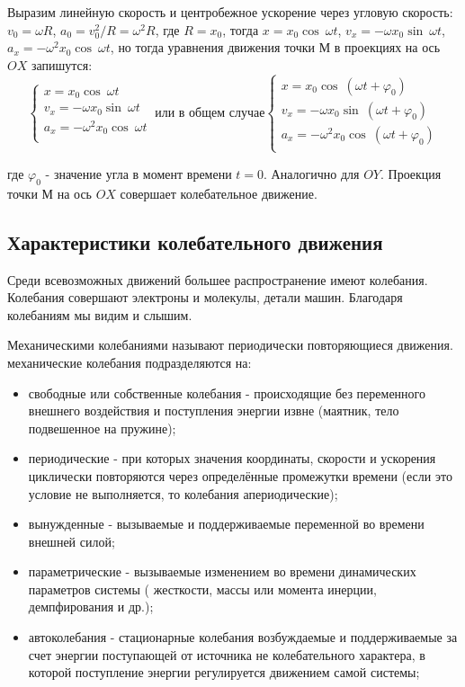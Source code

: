 \documentclass[a5paper, 10pt]{diss_4}
\renewcommand{\'}{\,'}
\begin{document}
Выразим линейную скорость и центробежное ускорение через угловую скорость:
$v_0=\omega R$, $a_0 = v_0^2/R = \omega^2R$, где  $R = x_0$, тогда  $x = x_0\cos\ \omega t$,
$v_x=-\omega x_0\sin\ \omega t$, $a_x=-\omega^2 x_0\cos\ \omega t$,  но тогда уравнения движения
точки $М$ в проекциях на ось $OX$ запишутся:
\begin{equation*}
     \left\{
          \begin{array}{lr}
x=x_0\cos\ \omega t\\
v_x=-\omega x_0\sin\ \omega t\\
a_x=-\omega^2 x_0\cos\ \omega t\\
          \end{array}
     \right.\ \text{или в общем случае}
     \left\{
          \begin{array}{lr}
x=x_0\cos\ (\omega t+\varphi_0)\\
v_x=-\omega x_0\sin\ (\omega t+\varphi_0)\\
a_x=-\omega^2 x_0\cos\ (\omega t+\varphi_0)\\
          \end{array}
     \right.
\end{equation*}

где $\varphi_0$ - значение угла в момент времени $t=0$.
Аналогично для $OY$. Проекция точки $М$ на ось $OX$ совершает колебательное движение.

\subsection{Характеристики колебательного движения}

Среди всевозможных движений большее распространение имеют колебания. Колебания совершают электроны и молекулы, детали машин. Благодаря колебаниям мы видим и слышим.

Механическими колебаниями называют периодически повторяющиеся движения. механические колебания подразделяются на:

\begin{itemize}
\item свободные или собственные колебания - происходящие без переменного внешнего воздействия и поступления энергии извне (маятник, тело подвешенное на пружине);
\item периодические - при которых значения координаты, скорости и ускорения циклически повторяются через определённые промежутки времени (если это условие не выполняется, то колебания апериодические);
\item вынужденные - вызываемые и поддерживаемые переменной во времени внешней силой;
\item параметрические - вызываемые изменением во времени динамических параметров системы ( жесткости, массы или момента инерции, демпфирования и др.);
\item автоколебания - стационарные колебания возбуждаемые и поддерживаемые за счет энергии поступающей от источника не колебательного характера, в которой поступление энергии регулируется движением самой системы;
\end{itemize}
\end{document}
